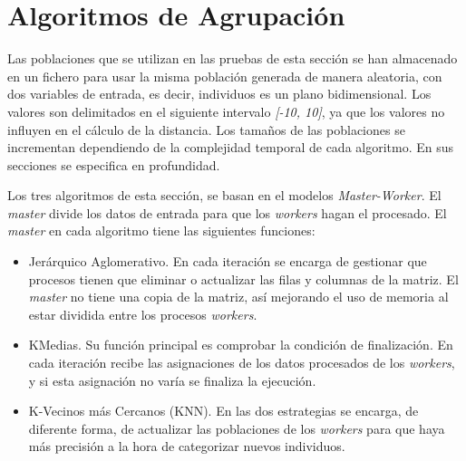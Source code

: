 		
			
			
	


\section{Algoritmos de Agrupación}

	Las poblaciones que se utilizan en las pruebas de esta sección se han almacenado en un fichero para usar la misma población generada de manera aleatoria, con dos variables de entrada, es decir, individuos es un plano bidimensional. Los valores son delimitados en el siguiente intervalo \textit{[-10, 10]}, ya que los valores no influyen en el cálculo de la distancia. Los tamaños de las poblaciones se incrementan dependiendo de la complejidad temporal de cada algoritmo. En sus secciones se especifica en profundidad.	
	
	Los tres algoritmos de esta sección, se basan en el modelos \textit{Master-Worker}. El \textit{master} divide los datos de entrada para que los \textit{workers} hagan el procesado. El \textit{master} en cada algoritmo tiene las siguientes funciones:	
	
	\begin{itemize}
		\item Jerárquico Aglomerativo. En cada iteración se encarga de gestionar que procesos tienen que eliminar o actualizar las filas y columnas de la matriz. El \textit{master} no tiene una copia de la matriz, así mejorando el uso de memoria al estar dividida entre los procesos \textit{workers}.
		\item KMedias. Su función principal es comprobar la condición de finalización. En cada iteración recibe las asignaciones de los datos procesados de los \textit{workers}, y si esta asignación no varía se finaliza la ejecución.
		\item K-Vecinos más Cercanos (KNN). En las dos estrategias se encarga, de diferente forma, de actualizar las poblaciones de los \textit{workers} para que haya más precisión a la hora de categorizar nuevos individuos.
	\end{itemize} 

	
